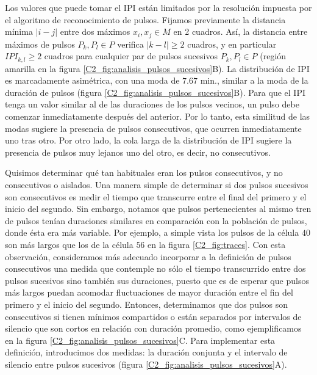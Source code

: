\documentclass[./main.tex]{subfiles}
\begin{document}
Los valores que puede tomar el IPI están limitados por la resolución impuesta por el algoritmo de reconocimiento de pulsos. Fijamos previamente la distancia mínima $|i-j|$ entre dos máximos $x_i, x_j \in M$ en 2 cuadros. Así, la distancia entre máximos de pulsos $P_k, P_l \in P$ verifica $ |k-l| \geq 2$ cuadros, y en particular $IPI_{k,l} \geq 2$ cuadros para cualquier par de pulsos sucesivos $P_k,P_l \in P$ (región amarilla en la figura \ref{C2_fig:analisis_pulsos_sucesivos}B). La distribución de IPI es marcadamente asimétrica, con una moda de $7.67$ min., similar a la moda de la duración de pulsos (figura \ref{C2_fig:analisis_pulsos_sucesivos}B). Para que el IPI tenga un valor similar al de las duraciones de los pulsos vecinos, un pulso debe comenzar inmediatamente después del anterior. Por lo tanto, esta similitud de las modas sugiere la presencia de pulsos consecutivos, que ocurren inmediatamente uno tras otro. Por otro lado, la cola larga de la distribución de IPI sugiere la presencia de pulsos muy lejanos uno del otro, es decir, no consecutivos.


Quisimos determinar qué tan habituales eran los pulsos consecutivos, y no consecutivos o aislados. Una manera simple de determinar si dos pulsos sucesivos son consecutivos es medir el tiempo que transcurre entre el final del primero y el inicio del segundo. Sin embargo, notamos que pulsos pertenecientes al mismo tren de pulsos tenían duraciones similares en comparación con la población de pulsos, donde ésta era más variable. Por ejemplo, a simple vista los pulsos de la célula $40$ son más largos que los de la célula $56$ en la figura \ref{C2_fig:traces}. Con esta observación, consideramos más adecuado incorporar a la definición de pulsos consecutivos una medida que contemple no sólo el tiempo transcurrido entre dos pulsos sucesivos sino también sus duraciones, puesto que es de esperar que pulsos más largos puedan acomodar fluctuaciones de mayor duración entre el fin del primero y el inicio del segundo. Entonces, determinamos que dos pulsos son consecutivos si tienen mínimos compartidos o están separados por intervalos de silencio que son cortos en relación con duración promedio, como ejemplificamos en la figura  \ref{C2_fig:analisis_pulsos_sucesivos}C. Para implementar esta definición, introducimos dos medidas: la duración conjunta y el intervalo de silencio entre pulsos sucesivos (figura \ref{C2_fig:analisis_pulsos_sucesivos}A).
\end{document}
